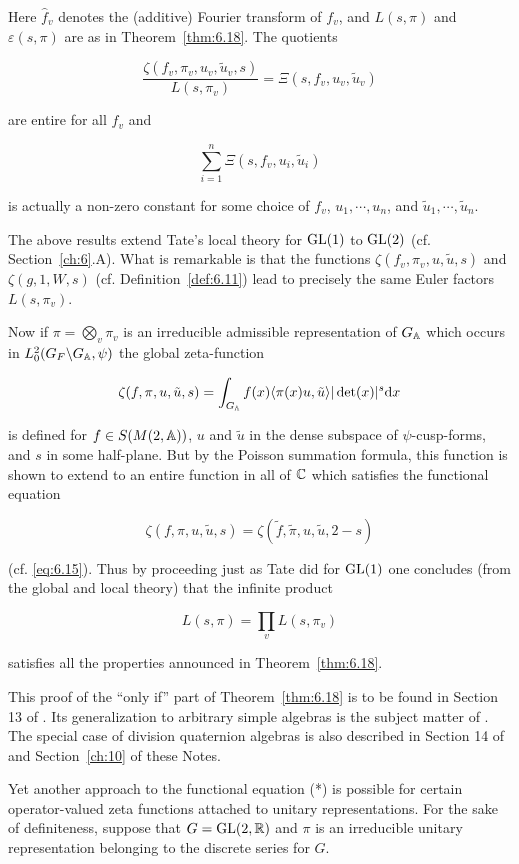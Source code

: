 Here $\hat{f}_v$ denotes the (additive) Fourier transform of $f_v$, and $L(s,\pi)$ and $\varepsilon(s,\pi)$ are as in Theorem~\ref{thm:6.18}. The quotients

\[
\frac{\zeta(f_v, \pi_v, u_v, \tilde{u}_v, s)}{L(s, \pi_v)} = \Xi(s, f_v, u_v, \tilde{u}_v)
\]

are entire for all $f_v$ and

\[
\sum_{i=1}^{n} \Xi(s, f_v, u_i, \tilde{u}_i)
\]

is actually a non-zero constant for some choice of $f_v$, $u_1, \cdots, u_n$, and $\tilde{u}_1, \cdots, \tilde{u}_n$.

The above results extend Tate's local theory for $\operatorname{GL}(1)$ to $\operatorname{GL}(2)$ (cf. Section~\ref{ch:6}.A). What is remarkable is that the functions $\zeta(f_v, \pi_v, u, \tilde{u}, s)$ and $\zeta(g, 1, W, s)$ (cf. Definition~\ref{def:6.11}) lead to precisely the same Euler factors $L(s, \pi_v)$.

Now if $\pi = \bigotimes_v \pi_v$ is an irreducible admissible representation of $G_{\mathbb{A}}$ which occurs in $L_0^2(G_F \backslash G_{\mathbb{A}}, \psi)$ the global zeta-function

\[
\zeta(f, \pi, u, \tilde{u}, s) = \int_{G_{\mathbb{A}}} f(x) \langle \pi(x)u, \tilde{u} \rangle |\det(x)|^s \mathrm{d} x
\]

is defined for $f \in S(M(2,\mathbb{A}))$, $u$ and $\tilde{u}$ in the dense subspace of $\psi$-cusp-forms, and $s$ in some half-plane. But by the Poisson summation formula, this function is shown to extend to an entire function in all of $\mathbb{C}$ which satisfies the functional equation

\[
\zeta(f, \pi, u, \tilde{u}, s) = \zeta(\tilde{f}, \tilde{\pi}, u, \tilde{u}, 2 - s)
\]

(cf. \eqref{eq:6.15}). Thus by proceeding just as Tate did for $\operatorname{GL}(1)$ one concludes (from the global and local theory) that the infinite product

\[
L(s, \pi) = \prod_v L(s, \pi_v)
\]

satisfies all the properties announced in Theorem~\ref{thm:6.18}.

This proof of the ``only if'' part of Theorem~\ref{thm:6.18} is to be found in Section 13 of \cite{JacquetLanglands}. Its generalization to arbitrary simple algebras is the subject matter of \cite{GodementJacquet}. The special case of division quaternion algebras is also described in Section 14 of \cite{JacquetLanglands} and Section~\ref{ch:10} of these Notes.

Yet another approach to the functional equation (*) is possible for certain operator-valued zeta functions attached to unitary representations. For the sake of definiteness, suppose that $G = \operatorname{GL}(2, \mathbb{R})$ and $\pi$ is an irreducible unitary representation belonging to the discrete series for $G$.

